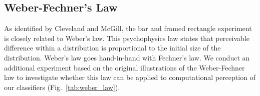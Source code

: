 \subsection{Weber-Fechner's Law}

As identified by Cleveland and McGill, the bar and framed rectangle experiment is closely related to Weber's law. This psychophysics law states that perceivable difference within a distribution is proportional to the initial size of the distribution. Weber's law goes hand-in-hand with Fechner's law. We conduct an additional experiment based on the original illustrations of the Weber-Fechner law to investigate whether this law can be applied to computational perception of our classifiers (Fig.~\ref{tab:weber_law}).

%
